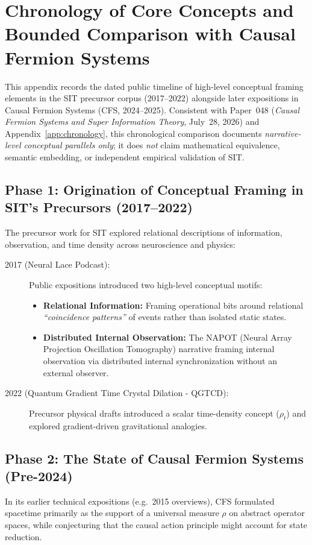 \section{Chronology of Core Concepts and Bounded Comparison with Causal Fermion Systems}
\label{app:cfs-chronology}

This appendix records the dated public timeline of high-level conceptual framing elements in the SIT precursor corpus (2017--2022) alongside later expositions in Causal Fermion Systems (CFS, 2024--2025). Consistent with Paper~048 (\emph{Causal Fermion Systems and Super Information Theory}, July~28, 2026) and Appendix~\ref{app:chronology}, this chronological comparison documents \emph{narrative-level conceptual parallels only}; it does \emph{not} claim mathematical equivalence, semantic embedding, or independent empirical validation of SIT.

\subsection{Phase 1: Origination of Conceptual Framing in SIT's Precursors (2017--2022)}
The precursor work for SIT explored relational descriptions of information, observation, and time density across neuroscience and physics:

\begin{description}
    \item[2017 (Neural Lace Podcast):] Public expositions introduced two high-level conceptual motifs:
    \begin{itemize}
        \item \textbf{Relational Information:} Framing operational bits around relational \textit{``coincidence patterns''} of events rather than isolated static states.
        \item \textbf{Distributed Internal Observation:} The NAPOT (Neural Array Projection Oscillation Tomography) narrative framing internal observation via distributed internal synchronization without an external observer.
    \end{itemize}
    \item[2022 (Quantum Gradient Time Crystal Dilation - QGTCD):] Precursor physical drafts introduced a scalar time-density concept ($\rho_t$) and explored gradient-driven gravitational analogies.
\end{description}

\subsection{Phase 2: The State of Causal Fermion Systems (Pre-2024)}
In its earlier technical expositions (e.g.\ 2015 overviews), CFS formulated spacetime primarily as the support of a universal measure $\rho$ on abstract operator spaces, while conjecturing that the causal action principle might account for state reduction.

